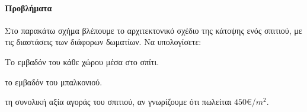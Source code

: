 \documentclass[11pt,a4paper,modern]{FFExercises}
\begin{document}
\paragraph{Προβλήματα}
\askhsh Στο παρακάτω σχήμα βλέπουμε το αρχιτεκτονικό σχέδιο της κάτοψης ενός σπιτιού, με τις διαστάσεις των διάφορων δωματίων. Να υπολογίσετε:
\begin{center}

\end{center}
\begin{alist}
\item Το εμβαδόν του κάθε χώρου μέσα στο σπίτι.
\item το εμβαδόν του μπαλκονιού.
\item τη συνολική αξία αγοράς του σπιτιού, αν γνωρίζουμε ότι πωλείται $450$\euro/$\si{m^2}$.
\end{alist}
\end{document}
